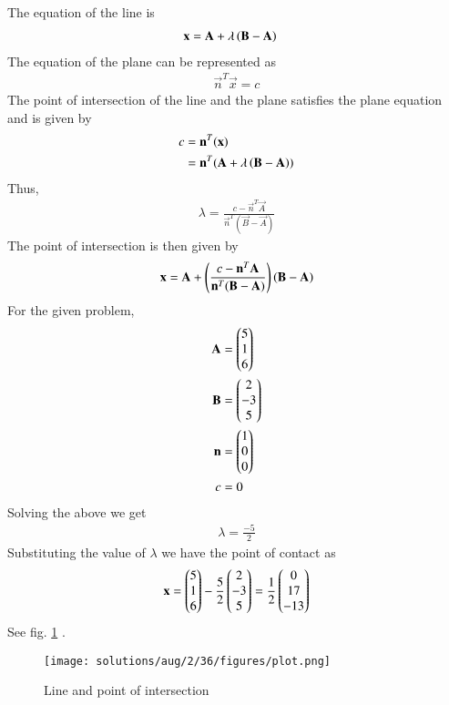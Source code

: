 The equation of the line is 
%
\begin{align}
\mathbf{x} &= \mathbf{A}+\lambda\left(\mathbf{B}-\mathbf{A}\right)
\end{align}
The equation of the plane can be represented as 
\begin{align}
    \vec{n}^T\vec{x}=c
\end{align}
The point of intersection of the line and the plane satisfies the plane equation and is given by
\begin{align}
    c&=\mathbf{n}^T(\mathbf{x})\\
    &=\mathbf{n}^T(\mathbf{A}+\lambda\left(\mathbf{B}-\mathbf{A}\right))
\end{align}  
Thus,
\begin{align}   
\lambda=\frac{c-\vec{n}^T\vec{A}}{\vec{n}^T(\vec{B}-\vec{A})}
\end{align}
The point of intersection is then given by
\begin{align}
    \mathbf{x}=\mathbf{A}+\left(\frac{c-\mathbf{n}^T\mathbf{A}}{\mathbf{n}^T(\mathbf{B}-\mathbf{A})}\right)\left(\mathbf{B}-\mathbf{A}\right)
\end{align}
For the given problem,
\begin{align}
\mathbf{A}&= \begin{pmatrix}5\\1\\6\end{pmatrix} \\
\mathbf{B}&= \begin{pmatrix}2\\-3\\5\end{pmatrix}\\
\mathbf{n}&=\begin{pmatrix}1\\0\\0\end{pmatrix}\\
    c&=0
\end{align}
Solving the above we get
\begin{align}
    \lambda=\frac{-5}{2}
\end{align}
Substituting the value of $\lambda$ we have the point of contact as
\begin{align}
 \mathbf{x}=\begin{pmatrix}5\\1\\6\end{pmatrix} -\frac{5}{2}\begin{pmatrix}2\\-3\\5\end{pmatrix} = \frac{1}{2}\begin{pmatrix}0\\17\\-13\end{pmatrix}
\end{align}
See fig. \ref{aug/2/26/fig:Line }	.
\begin{figure}[!ht]
\centering
\texttt{[image: solutions/aug/2/36/figures/plot.png]}
\caption{Line and point of intersection}
\label{aug/2/26/fig:Line }	
\end{figure}

